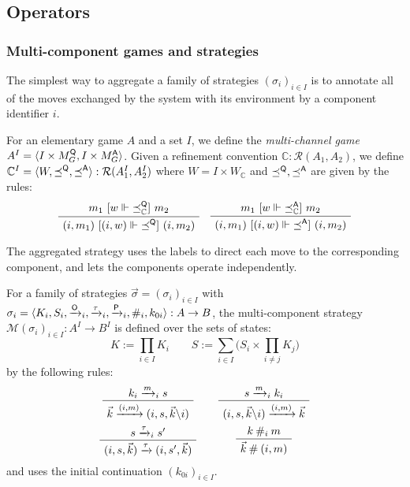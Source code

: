 
\subsection{Operators} %

\subsubsection{Multi-component games and strategies} %

The simplest way to aggregate a family of strategies $(\sigma_i)_{i\in I}$
is to annotate all of the moves exchanged by the system with its environment
by a component identifier $i$.

\begin{definition} %
For an elementary game $A$ and a set $I$,
we define the \emph{multi-channel game}
$A^I = \langle I \times M_G^{ \mathsf{Q} }, I \times M_G^{ \mathsf{A} } \rangle$.
Given a refinement convention
$\mathbb{C} : \mathcal{R}(A_1, A_2)$,
we define
$\mathbb{C}^I =
 \langle W, {\preceq}^{ \mathsf{Q} }, {\preceq}^{ \mathsf{A} } \rangle :
 \mathcal{R}(A_1^I, A_2^I)$
where
$W = I \times W_\mathbb{C}$ and
$\preceq^{ \mathsf{Q} }, \preceq^{ \mathsf{A} }$
are given by the rules:
\[
    \small
    \AxiomC{$m_1 \ifr{w \Vdash {\preceq}_\mathbb{C}^\kw{Q}} m_2$}
    \UnaryInfC{$(i, m_1) \ifr{(i, w) \Vdash {\preceq}^\kw{Q}} (i, m_2)$}
    \DisplayProof
    \quad
    \AxiomC{$m_1 \ifr{w \Vdash {\preceq}_\mathbb{C}^\kw{A}} m_2$}
    \UnaryInfC{$(i, m_1) \ifr{(i, w) \Vdash {\preceq}^\kw{A}} (i, m_2)$}
    \DisplayProof
\]
\end{definition}

The aggregated strategy uses the labels to direct each move
to the corresponding component,
and lets the components operate independently.

\begin{definition} %
For a family of strategies
$\vec{\sigma} = (\sigma_i)_{i \in I}$
with
$\sigma_i = \langle K_i, S_i, \xrightarrow{ \mathsf{O} }_i,
  \xrightarrow{\tau}_i, \xrightarrow{ \mathsf{P} }_i, \#_i, k_{0i} \rangle :
  A \rightarrow B$,
the multi-component strategy
$\mathcal{M}(\sigma_i)_{i \in I} : A^I \rightarrow B^I$
is defined over the sets of states:
\[
  K := \prod_{i \in I} K_i \qquad
  S := \sum_{i \in I}
    \Big( S_i \times \prod_{i \ne j} K_j \Big)
\]
by the following rules:
\[
  \begin{array}{c@{\qquad}c}
    \AxiomC{$k_i \xrightarrow{m}_i s$}
    \UnaryInfC{$\vec{k} \xrightarrow{(i, m)} (i, s, \vec{k} \backslash i)$}
    \DisplayProof
    &
    \AxiomC{$s \xrightarrow{m}_i k_i$}
    \UnaryInfC{$(i, s, \vec{k} \backslash i) \xrightarrow{(i, m)} \vec{k}$}
    \DisplayProof
    \\[1.5em]
    \AxiomC{$s \xrightarrow{\tau}_i s'$}
    \UnaryInfC{$(i, s, \vec{k}) \xrightarrow{\tau} (i, s', \vec{k})$}
    \DisplayProof
    &
    \AxiomC{$k \: \#_i \: m$}
    \UnaryInfC{$\vec{k} \: \# \: (i, m)$}
    \DisplayProof
  \end{array}
\]
and uses the initial continuation $(k_{0i})_{i \in I}$.
\end{definition}

